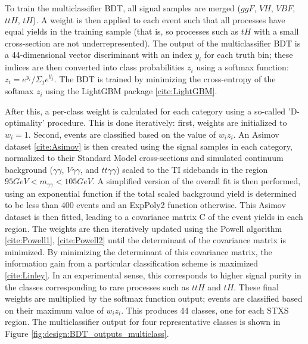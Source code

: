 To train the multiclassifier BDT, all signal samples are merged ($ggF$, $VH$, $VBF$, $ttH$, $tH$). A weight is then applied to each event such that all processes have equal yields in the training sample (that is, so processes such as $tH$ with a small cross-section are not underrepresented). The output of the multiclassifier BDT is a 44-dimensional vector discriminant with an index $y_{i}$ for each truth bin; these indices are then converted into class probabilities $z_{i}$ using a softmax function: $z_{i} = e^{y_{i}}/{\Sigma_{j}e^{y_{j}}}$. The BDT is trained by minimizing the cross-entropy of the softmax $z_{i}$ using the LightGBM package \ref{cite:LightGBM}.

After this, a per-class weight is calculated for each category using a so-called 'D-optimality' procedure. This is done iteratively: first, weights are initialized to $w_{i} = 1$. Second, events are classified based on the value of $w_{i}z_{i}$. An Asimov dataset \ref{cite:Asimov} is then created using the signal samples in each category, normalized to their Standard Model cross-sections and simulated continuum background ($\gamma\gamma$, $V\gamma\gamma$, and $tt\gamma\gamma$) scaled to the TI sidebands in the region $95 GeV < m_{\gamma \gamma} < 105 GeV$. A simplified version of the overall fit is then performed, using an exponential function if the total scaled background yield is determined to be less than 400 events and an ExpPoly2 function otherwise. This Asimov dataset is then fitted, leading to a covariance matrix C of the event yields in each region. The weights are then iteratively updated using the Powell algorithm \ref{cite:Powell1}, \ref{cite:Powell2} until the determinant of the covariance matrix is minimized. By minimizing the determinant of this covariance matrix, the information gain from a particular classification scheme is maximized \ref{cite:Linley}. In an experimental sense, this corresponds to higher signal purity in the classes corresponding to rare processes such as $ttH$ and $tH$. These final weights are multiplied by the softmax function output; events are classified based on their maximum value of $w_{i}z_{i}$. This produces 44 classes, one for each STXS region. The multiclassifier output for four representative classes is shown in Figure \ref{fig:design:BDT_outputs_multiclass}.


